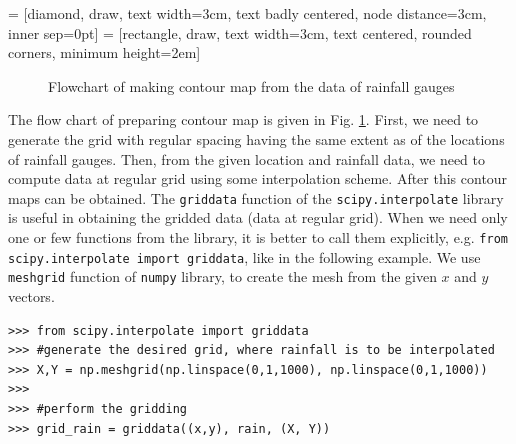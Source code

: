\documentclass[10pt]{book}
\begin{document}
{%
 = [diamond, draw, text width=3cm, text badly centered, node distance=3cm, inner sep=0pt]
 = [rectangle, draw, text width=3cm, text centered, rounded corners, minimum height=2em]
\begin{figure}
 \begin{center}
  \caption{Flowchart of making contour map from the data of rainfall gauges}
  \label{fig:flowchart}
 \end{center}
\end{figure}

The flow chart of preparing contour map is given in Fig. \ref{fig:flowchart}. First, we need to generate the grid with regular spacing having the same extent as of the locations of rainfall gauges. Then, from the given location and rainfall data, we need to compute data at regular grid using some interpolation scheme. After this contour maps can be obtained. The \verb"griddata" function of the \verb"scipy.interpolate" library is useful in obtaining the gridded data (data at regular grid). When we need only one or few functions from the library, it is better to call them explicitly, e.g. \verb"from scipy.interpolate import griddata", like in the following example. We use \verb"meshgrid" function of \verb"numpy" library, to create the mesh from the given $x$ and $y$ vectors. 

\beforeverb \begin{verbatim}
>>> from scipy.interpolate import griddata
>>> #generate the desired grid, where rainfall is to be interpolated
>>> X,Y = np.meshgrid(np.linspace(0,1,1000), np.linspace(0,1,1000))
>>> 
>>> #perform the gridding
>>> grid_rain = griddata((x,y), rain, (X, Y))
\end{verbatim} \afterverb
{}

}
\end{document}
